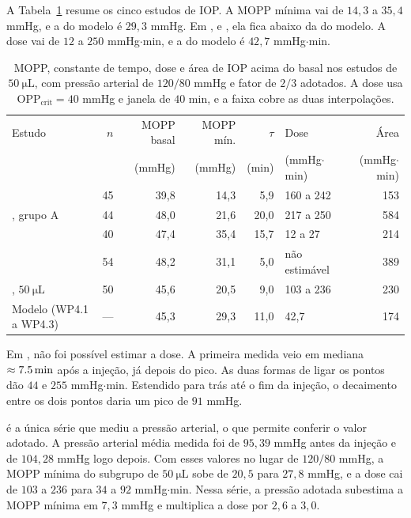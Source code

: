 A Tabela~\ref{tab_wp44} resume os cinco estudos de IOP. A MOPP mínima vai de $14{,}3$ a $35{,}4$ mmHg, e a do modelo é $29{,}3$ mmHg. Em \citet{sharei2010}, \citet{soheilian2017} e \citet{lee2016}, ela fica abaixo da do modelo. A dose vai de $12$ a $250$ mmHg$\cdot$min, e a do modelo é $42{,}7$ mmHg$\cdot$min.

\begin{table}[htbp]
\centering
\caption{MOPP, constante de tempo, dose e área de IOP acima do basal nos estudos de $\SI{50}{\micro\liter}$, com pressão arterial de $120/80$ mmHg e fator de $2/3$ adotados. A dose usa $\mathrm{OPP}_{\text{crit}}=40$ mmHg e janela de $40$ min, e a faixa cobre as duas interpolações.}
\label{tab_wp44}
\small
\begin{tabular}{@{}lrrrrlr@{}}
\toprule
Estudo & $n$ & MOPP basal & MOPP mín. & $\tau$ & Dose & Área \\
 & & (mmHg) & (mmHg) & (min) & (mmHg$\cdot$min) & (mmHg$\cdot$min) \\
\midrule
\citet{sharei2010} & 45 & 39,8 & 14,3 & 5,9 & 160 a 242 & 153 \\
\citet{soheilian2017}, grupo A & 44 & 48,0 & 21,6 & 20,0 & 217 a 250 & 584 \\
\citet{hu2022conbercept} & 40 & 47,4 & 35,4 & 15,7 & 12 a 27 & 214 \\
\citet{papazoglou2026} & 54 & 48,2 & 31,1 & 5,0 & não estimável & 389 \\
\citet{lee2016}, $\SI{50}{\micro\liter}$ & 50 & 45,6 & 20,5 & 9,0 & 103 a 236 & 230 \\
\midrule
Modelo (WP4.1 a WP4.3) & --- & 45,3 & 29,3 & 11,0 & 42,7 & 174 \\
\bottomrule
\end{tabular}
\end{table}

Em \citet{papazoglou2026}, não foi possível estimar a dose. A primeira medida veio em mediana $\approx\SI{7{,}5}{\minute}$ após a injeção, já depois do pico. As duas formas de ligar os pontos dão $44$ e $255$ mmHg$\cdot$min. Estendido para trás até o fim da injeção, o decaimento entre os dois pontos daria um pico de $91$ mmHg.

\citet{lee2016} é a única série que mediu a pressão arterial, o que permite conferir o valor adotado. A pressão arterial média medida foi de $95{,}39$ mmHg antes da injeção e de $104{,}28$ mmHg logo depois. Com esses valores no lugar de $120/80$ mmHg, a MOPP mínima do subgrupo de $\SI{50}{\micro\liter}$ sobe de $20{,}5$ para $27{,}8$ mmHg, e a dose cai de $103$ a $236$ para $34$ a $92$ mmHg$\cdot$min. Nessa série, a pressão adotada subestima a MOPP mínima em $7{,}3$ mmHg e multiplica a dose por $2{,}6$ a $3{,}0$.

